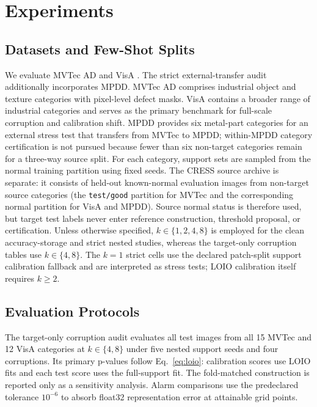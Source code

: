 \section{Experiments}\label{sec:experiments}
\subsection{Datasets and Few-Shot Splits}
We evaluate MVTec AD \cite{mvtec2019} and VisA \cite{visa2022}. The strict external-transfer audit additionally incorporates MPDD. MVTec AD comprises industrial object and texture categories with pixel-level defect masks. VisA contains a broader range of industrial categories and serves as the primary benchmark for full-scale corruption and calibration shift. MPDD provides six metal-part categories for an external stress test that transfers from MVTec to MPDD; within-MPDD category certification is not pursued because fewer than six non-target categories remain for a three-way source split. For each category, support sets are sampled from the normal training partition using fixed seeds. The CRESS source archive is separate: it consists of held-out known-normal evaluation images from non-target source categories (the \texttt{test/good} partition for MVTec and the corresponding normal partition for VisA and MPDD). Source normal status is therefore used, but target test labels never enter reference construction, threshold proposal, or certification. Unless otherwise specified, $k\in\{1,2,4,8\}$ is employed for the clean accuracy-storage and strict nested studies, whereas the target-only corruption tables use $k\in\{4,8\}$. The $k=1$ strict cells use the declared patch-split support calibration fallback and are interpreted as stress tests; LOIO calibration itself requires $k\geq2$.

\subsection{Evaluation Protocols}
The target-only corruption audit evaluates all test images from all 15 MVTec and 12 VisA categories at $k\in\{4,8\}$ under five nested support seeds and four corruptions. Its primary p-values follow Eq.~\eqref{eq:loio}: calibration scores use LOIO fits and each test score uses the full-support fit. The fold-matched construction is reported only as a sensitivity analysis. Alarm comparisons use the predeclared tolerance $10^{-6}$ to absorb float32 representation error at attainable grid points.

